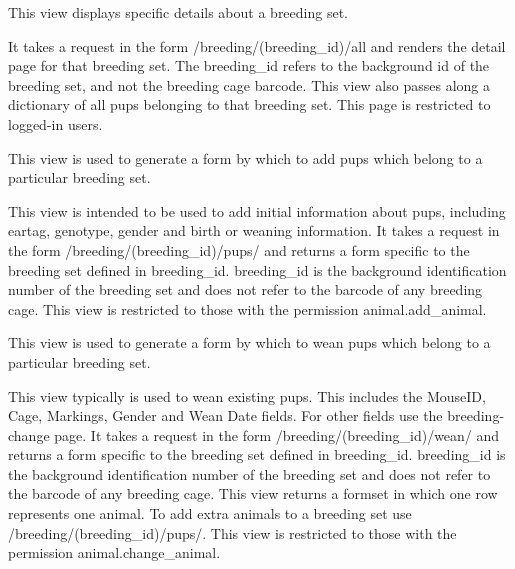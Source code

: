 \documentclass[letterpaper,10pt,english]{sphinxmanual}
\begin{document}
\begin{fulllineitems}
\label{api:animal.views.breeding_detail}
This view displays specific details about a breeding set.

It takes a request in the form /breeding/(breeding\_id)/all and renders the detail page for that breeding set.
The breeding\_id refers to the background id of the breeding set, and not the breeding cage barcode.
This view also passes along a dictionary of all pups belonging to that breeding set.
This page is restricted to logged-in users.

\end{fulllineitems}



\begin{fulllineitems}
\label{api:animal.views.breeding_pups}
This view is used to generate a form by which to add pups which belong to a particular breeding set.

This view is intended to be used to add initial information about pups, including eartag, genotype, gender and birth or weaning information.
It takes a request in the form /breeding/(breeding\_id)/pups/ and returns a form specific to the breeding set defined in breeding\_id.  breeding\_id is the background identification number of the breeding set and does not refer to the barcode of any breeding cage.
This view is restricted to those with the permission animal.add\_animal.

\end{fulllineitems}



\begin{fulllineitems}
\label{api:animal.views.breeding_wean}
This view is used to generate a form by which to wean pups which belong to a particular breeding set.

This view typically is used to wean existing pups.  This includes the MouseID, Cage, Markings, Gender and Wean Date fields.  For other fields use the breeding-change page.
It takes a request in the form /breeding/(breeding\_id)/wean/ and returns a form specific to the breeding set defined in breeding\_id.  breeding\_id is the background identification number of the breeding set and does not refer to the barcode of any breeding cage.
This view returns a formset in which one row represents one animal.  To add extra animals to a breeding set use /breeding/(breeding\_id)/pups/.
This view is restricted to those with the permission animal.change\_animal.

\end{fulllineitems}
\end{document}
